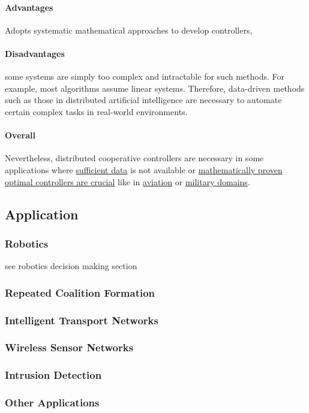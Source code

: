 \documentclass{article}
\begin{document}
					\paragraph{Advantages}
						Adopts systematic mathematical approaches to develop controllers, 
					\paragraph{Disadvantages}some systems are simply too complex and intractable for such methods. For example, most algorithms assume linear systems. Therefore, data-driven methods such as those in distributed artificial intelligence are necessary to automate certain complex tasks in real-world environments.
					\paragraph{Overall}
					 Nevertheless, distributed cooperative controllers are necessary in some applications where \underline{sufficient data} is not available or \underline{mathematically proven} \underline{optimal controllers are crucial} like in \underline{aviation} or \underline{military domains}.
				
				
			\subsection{Application} 
				\subsubsection{Robotics} see robotics decision making section
				\subsubsection{Repeated Coalition Formation}
				\subsubsection{Intelligent Transport Networks}
				\subsubsection{Wireless Sensor Networks}
				\subsubsection{Intrusion Detection}
				\subsubsection{Other Applications}
			
\end{document}
